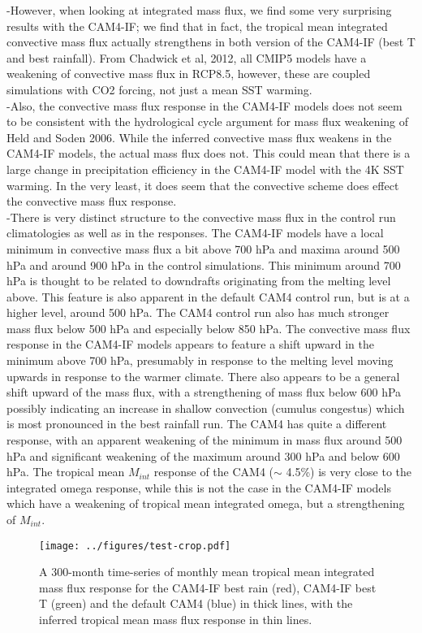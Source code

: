 \documentclass[letterpaper,12pt,titlepage,oneside,final]{book}
\begin{document}
-However, when looking at integrated mass flux, we find some very surprising results with the CAM4-IF; we find that in fact, the tropical mean integrated convective mass flux actually strengthens in both version of the CAM4-IF (best T and best rainfall). From Chadwick et al, 2012, all CMIP5 models have a weakening of convective mass flux in RCP8.5, however, these are coupled simulations with CO2 forcing, not just a mean SST warming. 
\\
-Also, the convective mass flux response in the CAM4-IF models does not seem to be consistent with the hydrological cycle argument for mass flux weakening of Held and Soden 2006. While the inferred convective mass flux weakens in the CAM4-IF models, the actual mass flux does not. This could mean that there is a large change in precipitation efficiency in the CAM4-IF model with the 4K SST warming. In the very least, it does seem that the convective scheme does effect the convective mass flux response.
\\
-There is very distinct structure to the convective mass flux in the control run climatologies as well as in the responses. The CAM4-IF models have a local minimum in convective mass flux a bit above 700 hPa and maxima around 500 hPa and around 900 hPa in the control simulations. This minimum around 700 hPa is thought to be related to downdrafts originating from the melting level above. This feature is also apparent in the default CAM4 control run, but is at a higher level, around 500 hPa. The CAM4 control run also has much stronger mass flux below 500 hPa and especially below 850 hPa. The convective mass flux response in the CAM4-IF models appears to feature a shift upward in the minimum above 700 hPa, presumably in response to the melting level moving upwards in response to the warmer climate. There also appears to be a general shift upward of the mass flux, with a strengthening of mass flux below 600 hPa possibly indicating an increase in shallow convection (cumulus congestus) which is most pronounced in the best rainfall run. The CAM4 has quite a different response, with an apparent weakening of the minimum in mass flux around 500 hPa and significant weakening of the maximum around 300 hPa and below 600 hPa. The tropical mean $M_{int}$ response of the CAM4 ($\sim$ 4.5\%) is very close to the integrated omega response, while this is not the case in the CAM4-IF models which have a weakening of tropical mean integrated omega, but a strengthening of $M_{int}$.
\begin{figure}[H]
\centering
\noindent\texttt{[image: ../figures/test-crop.pdf]}\hfill
\caption{A 300-month time-series of monthly mean tropical mean integrated mass flux response for the CAM4-IF best rain (red), CAM4-IF best T (green) and the default CAM4 (blue) in thick lines, with the inferred tropical mean mass flux response in thin lines.}
\end{figure}
\end{document}

